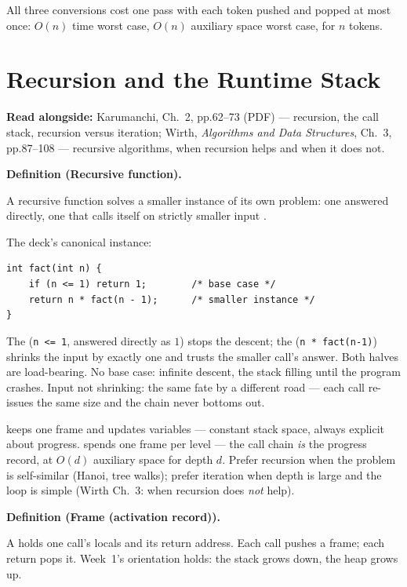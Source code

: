 \documentclass[11pt]{article}
\newenvironment{definitionbox}[1]{%
  \par\noindent\textbf{Definition (#1).}\ \itshape
}{\par\vspace{0.3em}}
\begin{document}
All three conversions cost one pass with each token pushed and popped at most once: $O(n)$ time worst case, $O(n)$ auxiliary space worst case, for $n$ tokens.

\section{Recursion and the Runtime Stack}

\textbf{Read alongside:} Karumanchi, Ch.~2, pp.62--73 (PDF) --- recursion, the call stack, recursion versus iteration; Wirth, \textit{Algorithms and Data Structures}, Ch.~3, pp.87--108 --- recursive algorithms, when recursion helps and when it does not.

\begin{definitionbox}{Recursive function}
A recursive function solves a smaller instance of its own problem: one  answered directly, one  that calls itself on strictly smaller input \cite{Karumanchi2017_data_structures_algorithms_made_easy,Wirth2004_algorithms_data_structures}.
\end{definitionbox}

The deck's canonical instance:
{\footnotesize
\begin{verbatim}
int fact(int n) {
    if (n <= 1) return 1;        /* base case */
    return n * fact(n - 1);      /* smaller instance */
}
\end{verbatim}
}
The  (\texttt{n <= 1}, answered directly as $1$) stops the descent; the  (\texttt{n * fact(n-1)}) shrinks the input by exactly one and trusts the smaller call's answer. Both halves are load-bearing. No base case: infinite descent, the stack filling until the program crashes. Input not shrinking: the same fate by a different road --- each call re-issues the same size and the chain never bottoms out.

 keeps one frame and updates variables --- constant stack space, always explicit about progress.  spends one frame per level --- the call chain \emph{is} the progress record, at $O(d)$ auxiliary space for depth $d$. Prefer recursion when the problem is self-similar (Hanoi, tree walks); prefer iteration when depth is large and the loop is simple (Wirth Ch.~3: when recursion does \emph{not} help). 

\begin{definitionbox}{Frame (activation record)}
A  holds one call's locals and its return address. Each call pushes a frame; each return pops it. Week~1's orientation holds: the stack grows down, the heap grows up.
\end{definitionbox}
\end{document}
